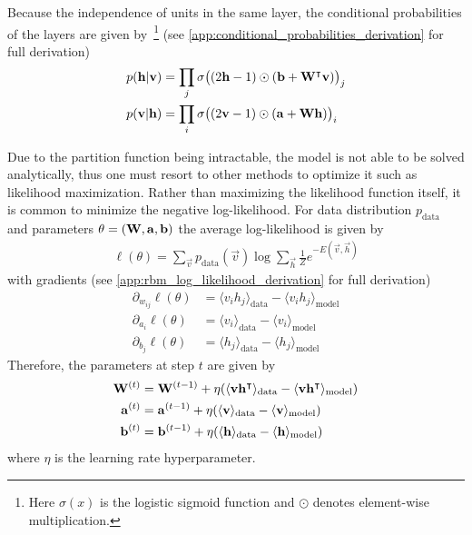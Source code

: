 Because the independence of units in the same layer, the conditional probabilities of the layers are given by~\footnote{Here \( \sigma(x) \) is the logistic sigmoid function and \( \odot \) denotes element-wise multiplication.} (see \cref{app:conditional_probabilities_derivation} for full derivation)
\begin{align}
    p(\mathbf{h} | \mathbf{v})
        &= \prod_j \sigma\big( (2\mathbf{h} - 1) \odot (\mathbf{b} + \mathbf{W}^\intercal\mathbf{v}) \big)_j \\
    p(\mathbf{v} | \mathbf{h})
        &= \prod_i \sigma\big( (2\mathbf{v} - 1) \odot (\mathbf{a} + \mathbf{W}\mathbf{h}) \big)_i
\end{align}

Due to the partition function being intractable, the model is not able to be solved analytically, thus one must resort to other methods to optimize it such as likelihood maximization.
Rather than maximizing the likelihood function itself, it is common to minimize the negative log-likelihood.
For data distribution \( p_\text{data} \) and parameters \( \theta = (\mathbf{W}, \mathbf{a}, \mathbf{b}) \) the average log-likelihood is given by
\begin{align}
    \ell(\theta) = \sum_{\vec{v}} p_{\text{data}}(\vec{v}) \log \sum_\vec{h} \frac{1}{Z} e^{-E(\vec{v},\vec{h})}
\end{align}
with gradients (see \cref{app:rbm_log_likelihood_derivation} for full derivation)
\begin{align}
    \partial_{w_{ij}} \ell(\theta)
        &= \langle v_i h_j \rangle_{\text{data}} - \langle v_i h_j \rangle_{\text{model}} \\
    \partial_{a_i} \ell(\theta)
        &= \langle v_i \rangle_{\text{data}} - \langle v_i \rangle_{\text{model}} \\
    \partial_{b_j} \ell(\theta)
        &= \langle h_j \rangle_{\text{data}} - \langle h_j \rangle_{\text{model}}
\end{align}
Therefore, the parameters at step \( t \) are given by
\begin{align}
    \mathbf{W}^{(t)}
        &= \mathbf{W}^{(t-1)} + \eta(\langle \mathbf{v} \mathbf{h}^\intercal \rangle_{\text{data}} - \langle \mathbf{v} \mathbf{h}^\intercal \rangle_{\text{model}}) \\
    \mathbf{a}^{(t)}
        &= \mathbf{a}^{(t-1)} + \eta(\langle \mathbf{v} \rangle_{\text{data}} - \langle \mathbf{v} \rangle_{\text{model}}) \\
    \mathbf{b}^{(t)}
        &= \mathbf{b}^{(t-1)} + \eta(\langle \mathbf{h} \rangle_{\text{data}} - \langle \mathbf{h} \rangle_{\text{model}})
\end{align}
where \( \eta \) is the learning rate hyperparameter.

